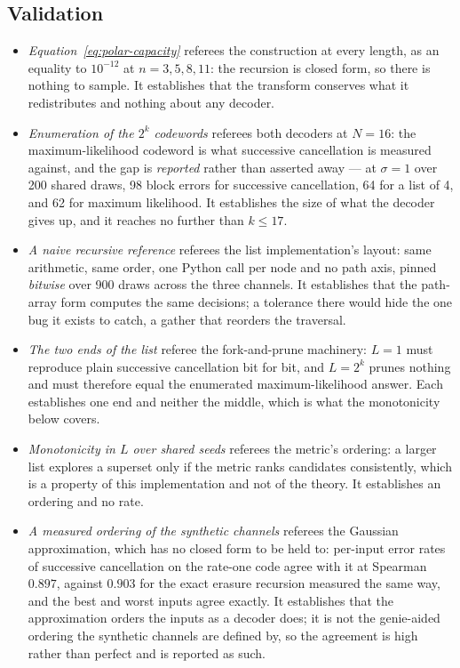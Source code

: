 \documentclass[11pt,a4paper]{article}
\begin{document}
\subsection{Validation}
\label{sec:polar:validation}
\begin{itemize}
  \item \emph{Equation~\ref{eq:polar-capacity}} referees the construction at
    every length, as an equality to $10^{-12}$ at $n = 3, 5, 8, 11$: the
    recursion is closed form, so there is nothing to sample. It establishes
    that the transform conserves what it redistributes and nothing about any
    decoder.
  \item \emph{Enumeration of the $2^{k}$ codewords} referees both decoders at
    $N = 16$: the maximum-likelihood codeword is what successive cancellation
    is measured against, and the gap is \emph{reported} rather than asserted
    away --- at $\sigma = 1$ over 200 shared draws, 98 block errors for
    successive cancellation, 64 for a list of 4, and 62 for maximum
    likelihood. It establishes the size of what the decoder gives up, and it
    reaches no further than $k \le 17$.
  \item \emph{A naive recursive reference} referees the list implementation's
    layout: same arithmetic, same order, one Python call per node and no path
    axis, pinned \emph{bitwise} over 900 draws across the three channels. It
    establishes that the path-array form computes the same decisions; a
    tolerance there would hide the one bug it exists to catch, a gather that
    reorders the traversal.
  \item \emph{The two ends of the list} referee the fork-and-prune machinery:
    $L = 1$ must reproduce plain successive cancellation bit for bit, and
    $L = 2^{k}$ prunes nothing and must therefore equal the enumerated
    maximum-likelihood answer. Each establishes one end and neither the
    middle, which is what the monotonicity below covers.
  \item \emph{Monotonicity in $L$ over shared seeds} referees the metric's
    ordering: a larger list explores a superset only if the metric ranks
    candidates consistently, which is a property of this implementation and
    not of the theory. It establishes an ordering and no rate.
  \item \emph{A measured ordering of the synthetic channels} referees the
    Gaussian approximation, which has no closed form to be held to: per-input
    error rates of successive cancellation on the rate-one code agree with it
    at Spearman $0.897$, against $0.903$ for the exact erasure recursion
    measured the same way, and the best and worst inputs agree exactly. It
    establishes that the approximation orders the inputs as a decoder does; it
    is not the genie-aided ordering the synthetic channels are defined by, so
    the agreement is high rather than perfect and is reported as such.
\end{itemize}
\end{document}
